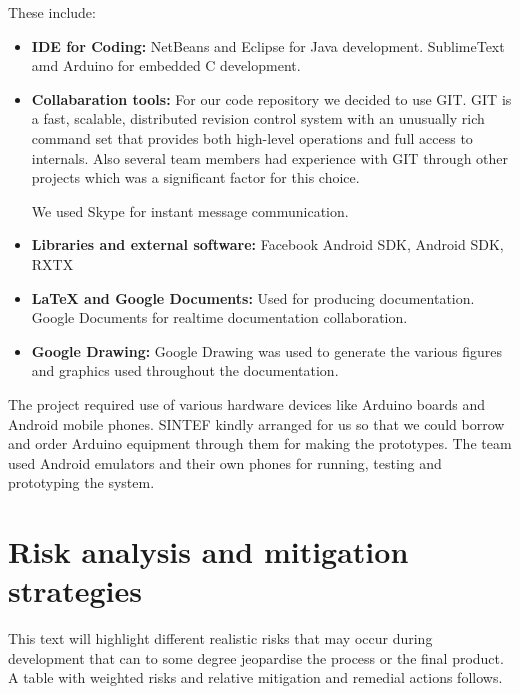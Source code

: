 These include:\newline
\begin{itemize}
	\item \textbf{IDE for Coding:} \newline
	NetBeans and Eclipse for Java development. SublimeText amd Arduino for embedded C development.

	\item \textbf{Collabaration tools:} \newline
	For our code repository we decided to use GIT\cite{link:git}. GIT is a fast, scalable, distributed revision control system 
	with an unusually rich command set that provides both high-level operations and full access to internals. Also 
	several team members had experience with GIT through other projects which was a significant factor for 
	this choice.

	We used Skype for instant message communication.

	\item \textbf{Libraries and external software:} \newline
	 Facebook Android SDK, Android SDK, RXTX

	\item \textbf{\LaTeX{} and Google Documents:} \newline
	Used for producing documentation. Google Documents for realtime documentation collaboration.

	\item \textbf{Google Drawing:} \newline
	Google Drawing was used to generate the various figures and graphics used throughout the documentation.

\end{itemize}

The project required use of various hardware devices like Arduino boards and Android mobile phones. SINTEF kindly arranged for us so that we could borrow and order Arduino equipment through them for making the prototypes. The team used Android emulators and their own phones for running, testing and prototyping the system.

\section{Risk analysis and mitigation strategies}

This text will highlight different realistic risks that may occur during development
that can to some degree jeopardise the process or the final product.
A table with weighted risks and relative mitigation and remedial actions follows.


